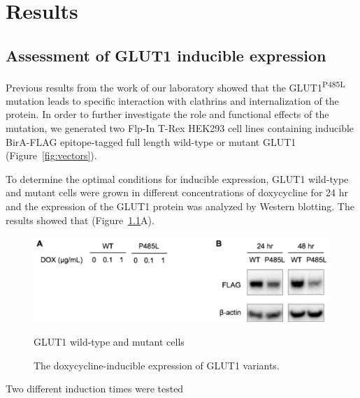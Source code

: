 
\chapter{Results} %
\label{Chapter3} %
\section{Assessment of GLUT1 inducible expression}
Previous results from the work of our laboratory showed that the GLUT1\textsuperscript{P485L} mutation leads to specific interaction with clathrins and internalization of the protein. In order to further investigate the role and functional effects of the mutation, we generated two Flp-In T-Rex HEK293 cell lines containing inducible BirA-FLAG epitope-tagged full length wild-type or mutant GLUT1 (Figure~\ref{fig:vectors}). 

To determine the optimal conditions for inducible expression, GLUT1 wild-type and mutant cells were grown in different concentrations of doxycycline for 24 hr and the expression of the GLUT1 protein was analyzed by Western blotting. The results showed that (Figure~\ref{fig:wb}A).
\begin{figure}[h]
\centering
\includegraphics[scale=0.7]{Figures/WB}
\caption{The doxycycline-inducible expression of GLUT1 variants.}
\medskip
\small \raggedright
GLUT1 wild-type and mutant cells
\label{fig:wb}
\end{figure}

Two different induction times were tested


